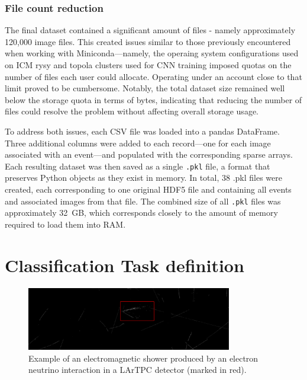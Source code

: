 \documentclass{pracalicmgr}
\begin{document}
\subsection{File count reduction}

The final dataset contained a significant amount of files - namely approximately 120,000 image files. This created issues similar to those previously encountered when working with Miniconda—namely, the operaing system configurations used on ICM rysy and topola clusters used for CNN training imposed quotas on the number of files each user could allocate. Operating under an account close to that limit proved to be cumbersome. Notably, the total dataset size remained well below the storage quota in terms of bytes, indicating that reducing the number of files could resolve the problem without affecting overall storage usage.

To address both issues, each CSV file was loaded into a pandas DataFrame. Three additional columns were added to each record—one for each image associated with an event—and populated with the corresponding sparse arrays. Each resulting dataset was then saved as a single \texttt{.pkl} file, a format that preserves Python objects as they exist in memory. In total, 38 .pkl files were created, each corresponding to one original HDF5 file and containing all events and associated images from that file. The combined size of all \texttt{.pkl} files was approximately 32~GB, which corresponds closely to the amount of memory required to load them into RAM.

\chapter{Classification Task definition}

\begin{figure}[H]
\centering
\includegraphics[width=0.8\textwidth]{src/electronShower.pdf}
\caption{Example of an electromagnetic shower produced by an electron neutrino interaction in a LArTPC detector (marked in red).}
\label{fig:electron_shower}
\end{figure}
\end{document}
